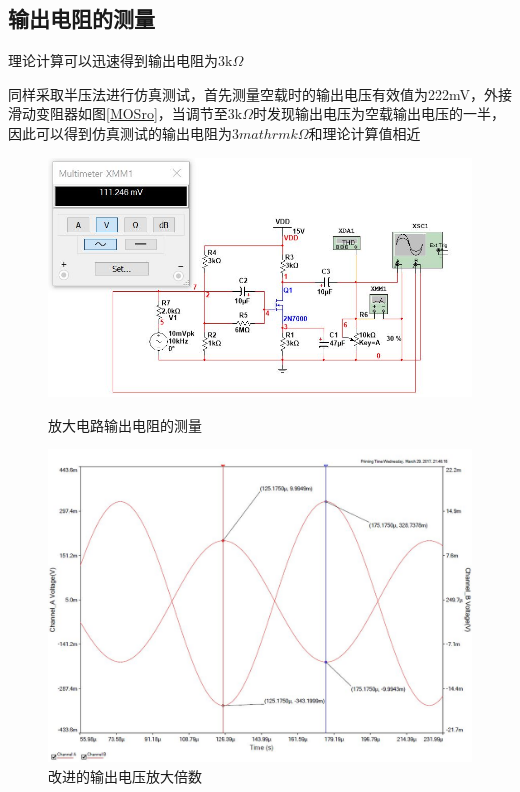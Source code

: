 \documentclass[UTF8,a4paper]{ctexart}
\begin{document}
\subsection{输出电阻的测量}
理论计算可以迅速得到输出电阻为$3\mathrm{k}\Omega$

同样采取半压法进行仿真测试，首先测量空载时的输出电压有效值为222mV，外接滑动变阻器如图\ref{MOSro}，当调节至3$\mathrm{k}\Omega$时发现输出电压为空载输出电压的一半，因此可以得到仿真测试的输出电阻为3$mathrm{k}\Omega$和理论计算值相近
\begin{figure}
\centering
\includegraphics[width=\textwidth]{2-4Ro.jpg}
\caption{放大电路输出电阻的测量}
\label{MOSro}
\includegraphics[width=\textwidth]{2-4AA.jpg}
\caption{改进的输出电压放大倍数}
\label{AAA}
\end{figure}
\end{document}
